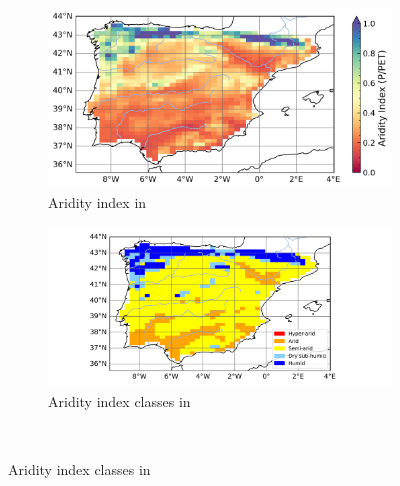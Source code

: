 \begin{figure}[htbp]
    \begin{subfigure}[b]{0.42\textwidth}
        \caption{Aridity index in \futirr}
        \includegraphics[width=\textwidth]{images/chap4/future/map_AI_fut_irr.png}
    \end{subfigure}
    \begin{subfigure}[b]{0.48\textwidth}
        \caption{Aridity index classes in \futirr}
        \includegraphics[width=\textwidth]{images/chap4/future/aridity_index_fut_irr.png}
    \end{subfigure}\\
    
    \vspace{1cm}


\end{figure}
